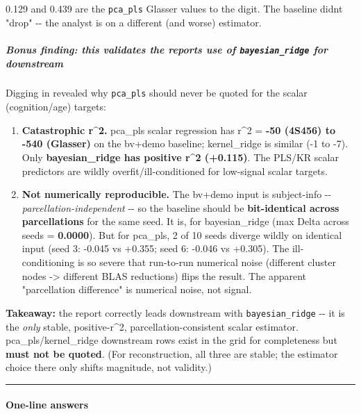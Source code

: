 0.129 and 0.439 are the \texttt{pca\_pls} Glasser values to the digit. The baseline didn\textquotesingle t "drop" -\/- the analyst is on a different (and worse) estimator.

\subparagraph{\texorpdfstring{Bonus finding: this \emph{validates} the report\textquotesingle s use of \texttt{bayesian\_ridge} for downstream}{Bonus finding: this validates the report\textquotesingle s use of bayesian\_ridge for downstream}}\label{bonus-finding-this-validates-the-reports-use-of-bayesian_ridge-for-downstream}

Digging in revealed why \texttt{pca\_pls} should never be quoted for the scalar (cognition/age) targets:

\begin{enumerate}
\def\labelenumi{\arabic{enumi}.}
\item
  \textbf{Catastrophic r\^{}2.} pca\_pls scalar regression has r\^{}2 = \textbf{-50 (4S456) to -540 (Glasser)} on the bv+demo baseline; kernel\_ridge is similar (-1 to -7). Only \textbf{bayesian\_ridge has positive r\^{}2 (+0.115)}. The PLS/KR scalar predictors are wildly overfit/ill-conditioned for low-signal scalar targets.
\item
  \textbf{Not numerically reproducible.} The bv+demo input is subject-info -\/- \emph{parcellation-independent} -\/- so the baseline should be \textbf{bit-identical across parcellations} for the same seed. It is, for bayesian\_ridge (max \textbar Delta\textbar{} across seeds = \textbf{0.0000}). But for pca\_pls, 2 of 10 seeds diverge wildly on identical input (seed 3: -0.045 vs +0.355; seed 6: -0.046 vs +0.305). The ill-conditioning is so severe that run-to-run numerical noise (different cluster nodes -\textgreater{} different BLAS reductions) flips the result. The apparent "parcellation difference" is numerical noise, not signal.
\end{enumerate}

\textbf{Takeaway:} the report correctly leads downstream with \texttt{bayesian\_ridge} -\/- it is the \emph{only} stable, positive-r\^{}2, parcellation-consistent scalar estimator. pca\_pls/kernel\_ridge downstream rows exist in the grid for completeness but \textbf{must not be quoted}. (For reconstruction, all three are stable; the estimator choice there only shifts magnitude, not validity.)

\begin{center}\rule{0.5\linewidth}{0.5pt}\end{center}

\paragraph{One-line answers}\label{one-line-answers}

